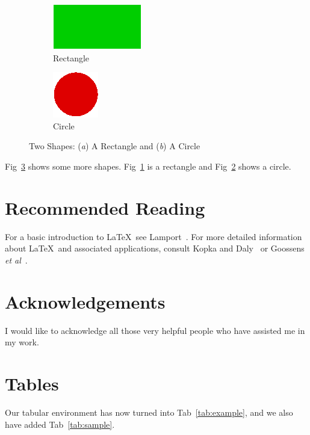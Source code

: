 \documentclass[12pt,captions=tableabove]{scrbook}
\renewcommand*{\figurename}{Fig}
\renewcommand*{\tablename}{Tab}
\begin{document}
\begin{figure}[hbtp]
 \begin{subfigure}[b]{0.5\linewidth}
   \centering
   \includegraphics{rectangle}
   \caption{Rectangle}\label{fig:rectangle}
 \end{subfigure}%
 \begin{subfigure}[b]{0.5\linewidth}
   \centering
   \includegraphics{circle}
   \caption{Circle}\label{fig:circle}
 \end{subfigure}%
\caption{Two Shapes: (\emph{a}) A Rectangle and
(\emph{b}) A Circle}
\label{fig:shapes2}
\end{figure}

\figurename~\ref{fig:shapes2} shows some more shapes.
\figurename~\ref{fig:rectangle} is a rectangle and
\figurename~\ref{fig:circle} shows a circle.

\chapter{Recommended Reading}

For a basic introduction to \LaTeX\ see Lamport~\cite{lamport94}.
For more detailed information about \LaTeX\ and
associated applications, consult Kopka and Daly~\cite{kopka95}
or Goossens \emph{et al}~\cite{goossens94}.

\chapter*{Acknowledgements}

I would like to acknowledge all those
very helpful people who have assisted
me in my work.

\appendix
\chapter{Tables}

Our tabular environment has now turned into \tablename~\ref{tab:example},
and we also have added \tablename~\ref{tab:sample}.
\end{document}

